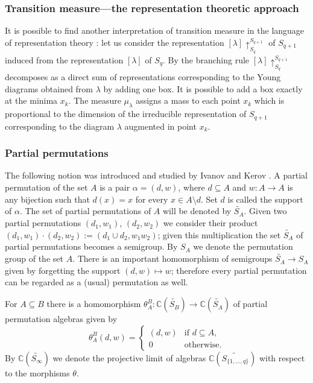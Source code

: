 \documentclass[12pt,dvips]{amsart}
\numberwithin{equation}{section} \numberwithin{figure}{section}
\theoremstyle{plain}
\theoremstyle{definition}
\theoremstyle{remark}
\newcommand{\C}{{\mathbb{C}}}
\newcommand{\Sn}[1]{{{S}}_{#1}}
\newcommand{\PartPerm}[1]{\widetilde{\Sn{#1}}}
\begin{document}
\subsubsection{Transition measure---the representation theoretic approach}
 It is possible to find
another interpretation of transition measure in the language of
representation theory
\cite{OkounkovVershik1996,Biane1998,Okounkov2000randompermutations}:
let us consider the representation
$[\lambda]\uparrow_{\Sn{q}}^{\Sn{q+1}}$ of $\Sn{q+1}$ induced from
the representation $[\lambda]$ of $\Sn{q}$. By the branching rule
$[\lambda]\uparrow_{\Sn{q}}^{\Sn{q+1}}$ decomposes as a direct sum
of representations corresponding to the Young diagrams obtained from
$\lambda$ by adding one box. It is possible to add a box exactly at
the minima $x_k$. The measure $\mu_\lambda$ assigns a mass to each
point $x_k$ which is proportional to the dimension of the
irreducible representation of $\Sn{q+1}$ corresponding to the
diagram $\lambda$ augmented in point $x_k$.




\subsubsection{Partial permutations}
The following notion was introduced and studied by Ivanov and Kerov
\cite{IvanovKerov1999}. 
 A partial permutation of the set $A$ is
a pair $\alpha=(d,w)$, where $d\subseteq A$ and $w:A\rightarrow A$
is any bijection such that $d(x)=x$ for every $x\in A\setminus d$.
Set $d$ is called the support of $\alpha$. The set of partial
permutations of $A$ will be denoted by \index{$S_A$@$\PartPerm{A}$}
$\PartPerm{A}$. Given two partial permutations $(d_1,w_1)$,
$(d_2,w_2)$ we consider their product $(d_1,w_1)\cdot
(d_2,w_2):=(d_1 \cup d_2, w_1 w_2)$; given this multiplication the
set $\PartPerm{A}$ of partial permutations becomes a semigroup. By
$\Sn{A}$ we denote the permutation group of the set $A$. There is an
important homomorphism of semigroups $\PartPerm{A}\rightarrow\Sn{A}$
given by forgetting the support $(d,w)\mapsto w$; therefore every
partial permutation can be regarded as a (usual) permutation as
well.

For $A\subseteq B$ there is a homomorphism
$\theta^B_A:\C(\PartPerm{B})\rightarrow \C(\PartPerm{A})$ of partial
permutation algebras given by
$$ \theta^B_A (d,w)=\begin{cases} (d,w) & \text{if } d
\subseteq A, \\ 0 & \text{otherwise}.\end{cases}$$ By
$\C(\PartPerm{\infty})$ we denote the projective limit of algebras
$\C(\PartPerm{\{1,\dots,q\}})$ with respect to the morphisms
$\theta$.
\end{document}

